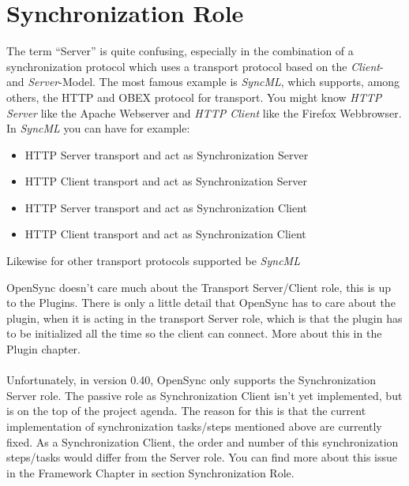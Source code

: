 \section{Synchronization Role}
The term ``Server'' is quite confusing,
especially in the combination of a synchronization protocol which uses a
transport protocol based on the \emph{Client}- and \emph{Server}-Model. The most famous
example is \emph{SyncML}, which supports, among others, the HTTP and OBEX protocol for
transport. You might know \emph{HTTP Server} like the Apache Webserver and \emph{HTTP
Client} like the Firefox Webbrowser. In \emph{SyncML} you can have for example:
\begin{itemize}
\item HTTP Server transport and act as Synchronization Server
\item HTTP Client transport and act as Synchronization Server
\item HTTP Server transport and act as Synchronization Client
\item HTTP Client transport and act as Synchronization Client
\end{itemize}
Likewise for other transport protocols supported be \emph{SyncML}

OpenSync doesn't care much about the Transport Server/Client role, this is
up to the Plugins. There is only a little detail that OpenSync has to care
about the plugin, when it is acting in the transport Server role, which is 
that the plugin has to be initialized all the time so the client can connect.
More about this in the Plugin chapter.\\
\\
Unfortunately, in version 0.40, OpenSync only supports the Synchronization Server
role. The passive role as Synchronization Client isn't yet implemented, but is
on the top of the project agenda. The reason for this is that the current
implementation of synchronization tasks/steps mentioned above are currently
fixed. As a Synchronization Client, the order and number of this synchronization 
steps/tasks would differ from the Server role. You can find more about this issue
in the Framework Chapter in section Synchronization Role.

